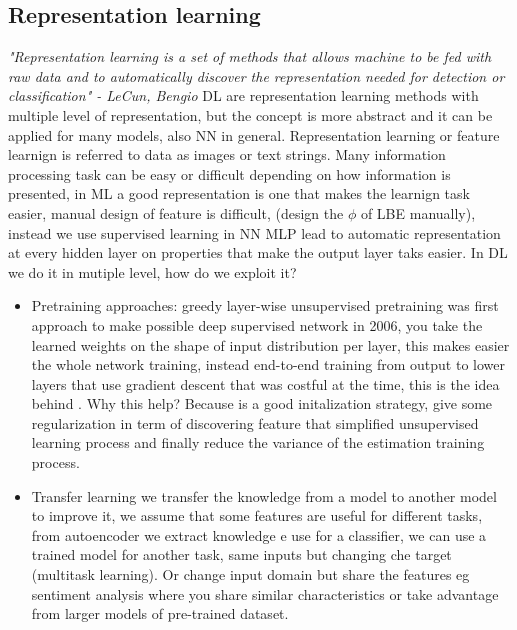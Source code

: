 \documentclass[12pt]{book}
\begin{document}
\subsection{Representation learning}
\textit{"Representation learning is a set of methods that allows machine to be fed with raw data and to automatically discover the representation needed for detection or classification" - LeCun, Bengio}
\newline\newline
DL are representation learning methods with multiple level of representation, but the concept is more abstract and it can be applied for many models, also NN in general.\newline
Representation learning or feature learnign is referred to data as images or text strings.\newline
Many information processing task can be easy or difficult depending on how information is presented, in ML a good representation is one that makes the learnign task easier, manual design of feature is difficult, (design the $\phi$ of LBE manually), instead we use supervised learning in NN MLP lead to automatic representation at every hidden layer on properties that make the output layer taks easier. In DL we do it in mutiple level, how do we exploit it?\newline
\clearpage
\begin{itemize}
	\item Pretraining approaches: greedy layer-wise unsupervised pretraining was first approach to make possible deep supervised network in 2006, you take the learned weights on the shape of input distribution per layer, this makes easier the whole network training, instead end-to-end training from output to lower layers that use gradient descent that was costful at the time, this is the idea behind .\newline
	Why this help? Because is a good initalization strategy, give some regularization in term of discovering feature that simplified unsupervised learning process and finally reduce the variance of the estimation training process.
	\item Transfer learning we transfer the knowledge from a model to another model to improve it, we assume that some features are useful for different tasks, from autoencoder we extract knowledge e use for a classifier, we can use a trained model for another task, same inputs but changing che target (multitask learning). Or change input domain but share the features eg sentiment analysis where you share similar characteristics or take advantage from larger models of pre-trained dataset.
\end{itemize}
\end{document}
